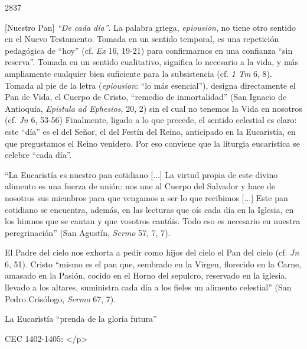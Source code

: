 			\begin{ccebody}\begin{ccenumber}2837\end{ccenumber} [Nuestro Pan] \textit{“De cada día”}. La palabra griega, \textit{epiousion}, no tiene otro sentido en el Nuevo Testamento. Tomada en un sentido temporal, es una repetición pedagógica de “hoy” (cf. \textit{Ex} 16, 19-21) para confirmarnos en una confianza “sin reserva”. Tomada en un sentido cualitativo, significa lo necesario a la vida, y más ampliamente cualquier bien suficiente para la subsistencia (cf. \textit{1 Tm} 6, 8). Tomada al pie de la letra (\textit{epiousion}: “lo más esencial”), designa directamente el Pan de Vida, el Cuerpo de Cristo, “remedio de inmortalidad” (San Ignacio de Antioquía, \textit{Epistula ad Ephesios,} 20, 2) sin el cual no tenemos la Vida en nosotros (cf. \textit{Jn} 6, 53-56) Finalmente, ligado a lo que precede, el sentido celestial es claro: este “día” es el del Señor, el del Festín del Reino, anticipado en la Eucaristía, en que pregustamos el Reino venidero. Por eso conviene que la liturgia eucarística se celebre “cada día”.\end{ccebody}
			
			\begin{ccecite}“La Eucaristía es nuestro pan cotidiano [...] La virtud propia de este divino alimento es una fuerza de unión: nos une al Cuerpo del Salvador y hace de nosotros sus miembros para que vengamos a ser lo que recibimos [...] Este pan cotidiano se encuentra, además, en las lecturas que oís cada día en la Iglesia, en los himnos que se cantan y que vosotros cantáis. Todo eso es necesario en nuestra peregrinación” (San Agustín, \textit{Sermo} 57, 7, 7).\end{ccecite}
			
			\begin{ccebody}El Padre del cielo nos exhorta a pedir como hijos del cielo el Pan del cielo (cf. \textit{Jn} 6, 51). Cristo “mismo es el pan que, sembrado en la Virgen, florecido en la Carne, amasado en la Pasión, cocido en el Horno del sepulcro, reservado en la iglesia, llevado a los altares, suministra cada día a los fieles un alimento celestial” (San Pedro Crisólogo, \textit{Sermo} 67, 7).\end{ccebody}
			
			\begin{ccetheme}La Eucaristía “prenda de la gloria futura” \end{ccetheme}
			
			\begin{ccereference}\end{ccereference}CEC 1402-1405: </p>
			
